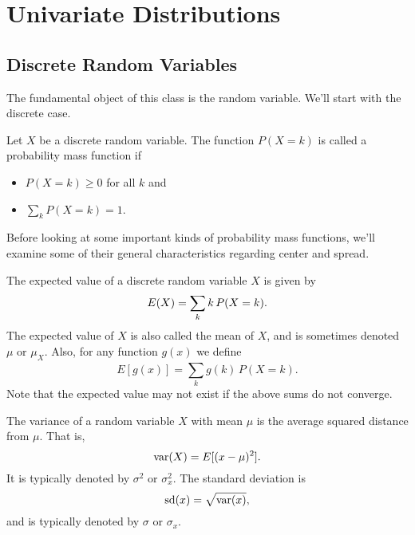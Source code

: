 \documentclass[../m157main.tex]{subfiles}
\begin{document}
\chapter{Univariate Distributions}
\section{Discrete Random Variables}
The fundamental object of this class is the random variable.
We'll start with the discrete case.

\begin{definition}
    Let $X$ be a discrete random variable.
    The function $P(X = k)$ is called a probability mass function if
    \begin{itemize}
        \item $P(X = k) \geq 0$ for all $k$ and
        \item $\sum_k P(X = k) = 1$.
    \end{itemize}
\end{definition}

Before looking at some important kinds of probability mass functions, we'll examine some of their general characteristics regarding center and spread.

\begin{definition}
    The expected value of a discrete random variable $X$ is given by \vspace{-4pt}
    \[ E(X) = \sum_k k \,P(X = k). \vspace{-4pt}     \]
    The expected value of $X$ is also called the mean of $X$, and is sometimes denoted $\mu$ or $\mu_X$.
    Also, for any function $g(x)$ we define \vspace{-8pt}
    \[ E[g(x)] = \sum_{k}^{} g(k) \,P(X = k). \]
    Note that the expected value may not exist if the above sums do not converge.
\end{definition}

\begin{definition}
    The variance of a random variable $X$ with mean $\mu$ is the average squared distance from $\mu$.
    That is, \vspace{-4pt}
    \[ \textrm{var}(X) = E[(x-\mu)^2]. \] \vspace{-4pt}
    It is typically denoted by $\sigma^2$ or $\sigma_x^2$.
    The standard deviation is
    \[ \pfn{sd}(x) = \sqrt{\pfn{var}(x)}, \vspace{-8pt} \]
    and is typically denoted by $\sigma$ or $\sigma_x$.
\end{definition}
\end{document}
